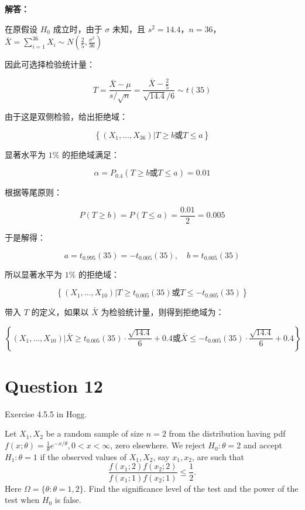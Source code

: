 \documentclass[12pt,a4paper]{article}
\begin{document}
\begin{answerbox}
\textbf{解答：}

在原假设 $H_0$ 成立时，由于 $\sigma$ 未知，且 $s^2=14.4$，$n=36$，$\bar{X} = \sum_{i=1}^{36} X_i \sim N\left(\frac{2}{5}, \frac{\sigma^2}{36}\right)$

因此可选择检验统计量：

$$
T = \frac{\bar{X}-\mu}{s/\sqrt{n}} = \frac{\bar{X}-\frac{2}{5}}{\sqrt{14.4}/6} \sim t(35)
$$

由于这是双侧检验，给出拒绝域：

$$
\left\{(X_1, \ldots, X_{36})| T \geq b \text{或} T \leq a\right\}
$$

显著水平为 $1\%$ 的拒绝域满足：

$$
\alpha = P_{0.4}\left(T \geq b \text{或} T \leq a\right) = 0.01
$$

根据等尾原则：

$$
P\left(T \geq b\right) = P\left(T \leq a\right) = \frac{0.01}{2} = 0.005
$$

于是解得：

$$
a = t_{0.995}(35) = -t_{0.005}(35), \quad b = t_{0.005}(35)
$$


所以显著水平为 $1\%$ 的拒绝域：

$$
\left\{(X_1, \ldots, X_{10})| T \geq t_{0.005}(35) \text{或} T \leq -t_{0.005}(35)\right\}
$$

带入 $T$ 的定义，如果以 $\bar{X}$ 为检验统计量，则得到拒绝域为：

$$
\left\{(X_1, \ldots, X_{10})| \bar{X} \geq t_{0.005}(35)\cdot \frac{\sqrt{14.4}}{6} + 0.4 \text{或} \bar{X} \leq -t_{0.005}(35)\cdot \frac{\sqrt{14.4}}{6} + 0.4\right\}
$$

\end{answerbox}

\section{Question 12}

Exercise 4.5.5 in Hogg.

Let $X_1,X_2$ be a random sample of size $n=2$ from the distribution having pdf $f(x;\theta) = \frac{1}{\theta}e^{-x/\theta}, 0 < x < \infty$, zero elsewhere. We reject $H_0: \theta=2$ and accept $H_1: \theta=1$ if the observed values of $X_1,X_2$, say $x_1,x_2$, are such that
\[
\frac{f(x_1;2)f(x_2;2)}{f(x_1;1)f(x_2;1)} \leq \frac{1}{2}.
\]
Here $\Omega = \{\theta: \theta=1,2\}$. Find the significance level of the test and the power of the test when $H_0$ is false.
\end{document}
